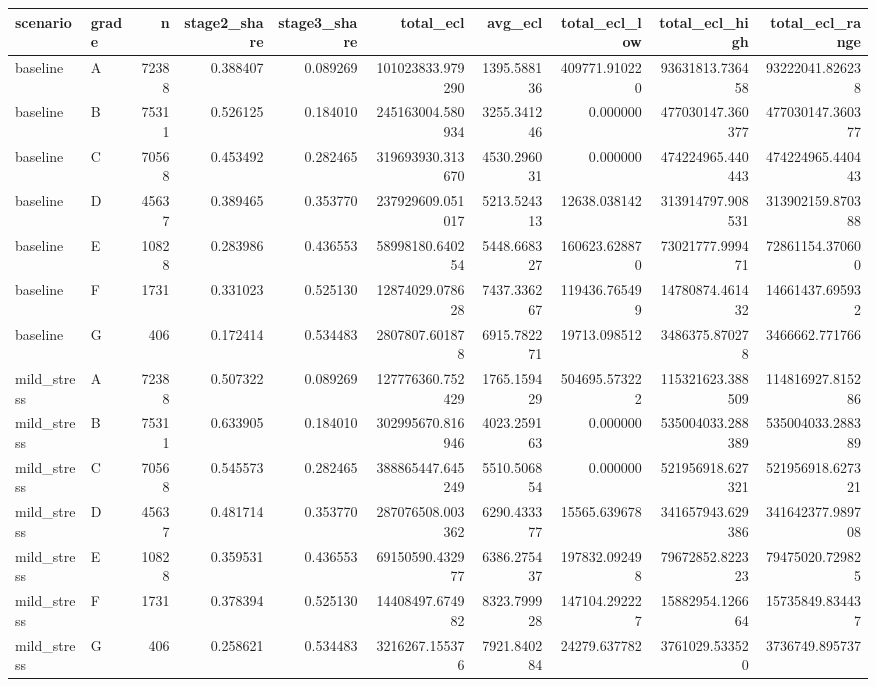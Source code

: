 \begin{tabular}{llrrrrrrrr}
\toprule
scenario & grade & n & stage2_share & stage3_share & total_ecl & avg_ecl & total_ecl_low & total_ecl_high & total_ecl_range \\
\midrule
baseline & A & 72388 & 0.388407 & 0.089269 & 101023833.979290 & 1395.588136 & 409771.910220 & 93631813.736458 & 93222041.826238 \\
baseline & B & 75311 & 0.526125 & 0.184010 & 245163004.580934 & 3255.341246 & 0.000000 & 477030147.360377 & 477030147.360377 \\
baseline & C & 70568 & 0.453492 & 0.282465 & 319693930.313670 & 4530.296031 & 0.000000 & 474224965.440443 & 474224965.440443 \\
baseline & D & 45637 & 0.389465 & 0.353770 & 237929609.051017 & 5213.524313 & 12638.038142 & 313914797.908531 & 313902159.870388 \\
baseline & E & 10828 & 0.283986 & 0.436553 & 58998180.640254 & 5448.668327 & 160623.628870 & 73021777.999471 & 72861154.370600 \\
baseline & F & 1731 & 0.331023 & 0.525130 & 12874029.078628 & 7437.336267 & 119436.765499 & 14780874.461432 & 14661437.695932 \\
baseline & G & 406 & 0.172414 & 0.534483 & 2807807.601878 & 6915.782271 & 19713.098512 & 3486375.870278 & 3466662.771766 \\
mild_stress & A & 72388 & 0.507322 & 0.089269 & 127776360.752429 & 1765.159429 & 504695.573222 & 115321623.388509 & 114816927.815286 \\
mild_stress & B & 75311 & 0.633905 & 0.184010 & 302995670.816946 & 4023.259163 & 0.000000 & 535004033.288389 & 535004033.288389 \\
mild_stress & C & 70568 & 0.545573 & 0.282465 & 388865447.645249 & 5510.506854 & 0.000000 & 521956918.627321 & 521956918.627321 \\
mild_stress & D & 45637 & 0.481714 & 0.353770 & 287076508.003362 & 6290.433377 & 15565.639678 & 341657943.629386 & 341642377.989708 \\
mild_stress & E & 10828 & 0.359531 & 0.436553 & 69150590.432977 & 6386.275437 & 197832.092498 & 79672852.822323 & 79475020.729825 \\
mild_stress & F & 1731 & 0.378394 & 0.525130 & 14408497.674982 & 8323.799928 & 147104.292227 & 15882954.126664 & 15735849.834437 \\
mild_stress & G & 406 & 0.258621 & 0.534483 & 3216267.155376 & 7921.840284 & 24279.637782 & 3761029.533520 & 3736749.895737 \\

\end{tabular}
